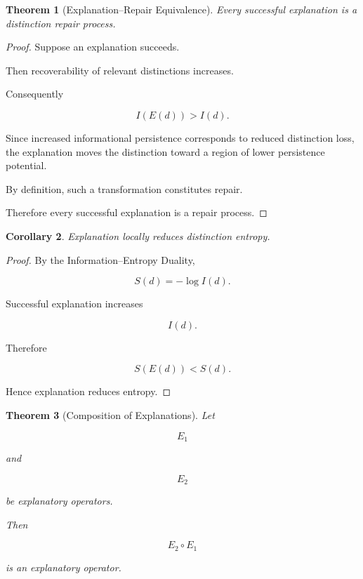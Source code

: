 \documentclass[12pt,oneside]{article}
\newtheorem{theorem}{Theorem}[section] \newtheorem{lemma}[theorem]{Lemma} \newtheorem{proposition}[theorem]{Proposition} \newtheorem{corollary}[theorem]{Corollary}
\theoremstyle{definition}
\begin{document}
\begin{theorem}[Explanation–Repair Equivalence]

Every successful explanation is a distinction repair process.

\end{theorem}

\begin{proof}

Suppose an explanation succeeds.

Then recoverability of relevant distinctions increases.

Consequently

\[
I(E(d))
>
I(d).
\]

Since increased informational persistence corresponds to reduced distinction loss, the explanation moves the distinction toward a region of lower persistence potential.

By definition, such a transformation constitutes repair.

Therefore every successful explanation is a repair process.

\end{proof}

\begin{corollary}

Explanation locally reduces distinction entropy.

\end{corollary}

\begin{proof}

By the Information–Entropy Duality,

\[
S(d)
=
-\log I(d).
\]

Successful explanation increases

\[
I(d).
\]

Therefore

\[
S(E(d))
<
S(d).
\]

Hence explanation reduces entropy.

\end{proof}

\begin{theorem}[Composition of Explanations]

Let

\[
E_1
\]

and

\[
E_2
\]

be explanatory operators.

Then

\[
E_2\circ E_1
\]

is an explanatory operator.

\end{theorem}
\end{document}
